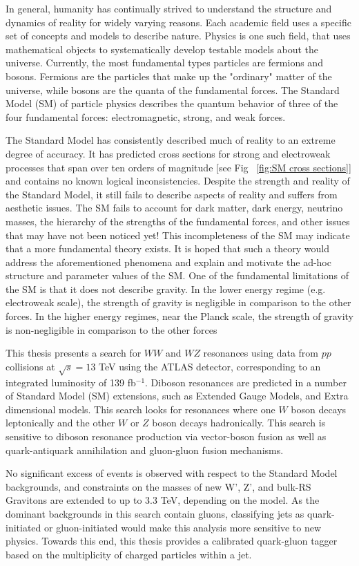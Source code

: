 In general, humanity has continually strived to understand the structure and dynamics of reality for widely varying reasons. Each academic field uses a specific set of concepts and models to describe nature. Physics is one such field, that uses mathematical objects to systematically develop testable models about the universe. Currently, the most fundamental types particles are fermions and bosons. Fermions are the particles that make up the "ordinary" matter of the universe, while bosons are the quanta of the fundamental forces. The Standard Model (SM) of particle physics describes the quantum behavior of three of the four fundamental forces: electromagnetic, strong, and weak forces. 

The Standard Model has consistently described much of reality to an extreme degree of accuracy. It has predicted cross sections for strong and electroweak processes that span over ten orders of magnitude [see Fig ~\ref{fig:SM cross sections}] and contains no known logical inconsistencies. Despite the strength and reality of the Standard Model, it still fails to describe aspects of reality and suffers from aesthetic issues. 
The SM fails to account for dark matter, dark energy, neutrino masses, the hierarchy of the strengths of the fundamental forces, and other issues that may have not been noticed yet! This incompleteness of the SM may indicate that a more fundamental theory exists. It is hoped that such a theory would address the aforementioned phenomena and explain and motivate the ad-hoc structure and parameter values of the SM. One of the fundamental limitations of the SM is that it does not describe gravity. In the lower energy regime (e.g. electroweak scale), the strength of gravity is negligible in comparison to the other forces. In the higher energy regimes, near the Planck scale, the strength of gravity is non-negligible in comparison to the other forces 

This thesis presents a search for $WW$ and $WZ$ resonances using data from $pp$ collisions at $\sqrt{s}=13$ TeV using the ATLAS detector, corresponding to an integrated luminosity of 139 fb$^{-1}$. Diboson resonances are predicted in a number of Standard Model (SM) extensions, such as Extended Gauge Models, and Extra dimensional models. This search looks for resonances where one $W$ boson decays leptonically and the other $W$ or $Z$ boson decays hadronically. This search is sensitive to diboson resonance production via vector-boson fusion as well as quark-antiquark annihilation and gluon-gluon fusion mechanisms. 


No significant excess of events is observed with respect to the Standard Model backgrounds, and constraints on the masses of new W', Z', and bulk-RS Gravitons are extended to up to 3.3 TeV, depending on the model. As the dominant backgrounds in this search contain gluons, classifying jets as quark-initiated or gluon-initiated would make this analysis more sensitive to new physics. Towards this end, this thesis provides a calibrated quark-gluon tagger based on the multiplicity of charged particles within a jet.